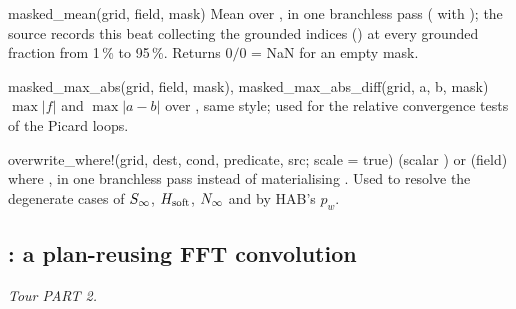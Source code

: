 \begin{fnlist}
\item[masked\_mean(grid, field, mask)] Mean over , in one branchless pass ( with ); the
  source records this beat collecting the grounded indices () at every grounded fraction from 1\,\% to 95\,\%.
  Returns $0/0$ = NaN for an empty mask.
\item[masked\_max\_abs(grid, field, mask), masked\_max\_abs\_diff(grid, a, b, mask)] $\max|f|$ and $\max|a-b|$ over ,
  same style; used for the relative convergence tests of the Picard loops.
\item[overwrite\_where!(grid, dest, cond, predicate, src; scale = true)]  (scalar ) or
   (field) where , in one branchless pass instead of materialising
  . Used to resolve the degenerate cases of ${S_\infty}$, $H_{\rm soft}$, ${N_\infty}$ and by HAB's $p_w$.
\end{fnlist}

\subsection{: a plan-reusing FFT convolution}\label{ref:fft}
\emph{Tour PART 2.}

